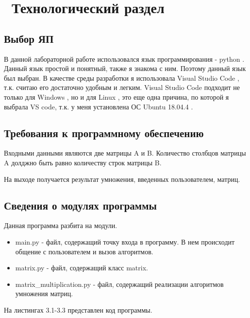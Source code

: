\chapter{ Технологический раздел}
\label{cha:design}

\section{Выбор ЯП}

В данной лабораторной работе использовался язык программирования - python \cite{bib1}.
Данный язык простой и понятный, также я знакома с ним.
Поэтому данный язык был выбран. 
В качестве среды разработки я использовала Visual Studio Code \cite{bib2}, т.к. считаю его достаточно удобным и легким.
Visual Studio Code подходит не только для  Windows \cite{bib3}, но и для Linux \cite{bib4}, это еще одна причина, по которой я выбрала VS code, т.к. у меня установлена ОС Ubuntu 18.04.4 \cite{bib5}.

\section{Требования к программному обеспечению}

Входными данными являются две матрицы A и B.
Количество столбцов матрицы A долджно быть равно количеству строк матрицы B. 

На выходе получается результат умножения, введенных пользователем, матриц.

\section{Сведения о модулях программы}

Данная программа разбита на модули.

\begin{itemize}
    \item main.py - файл, содержащий точку входа в программу. В нем происходит общение с пользователем и вызов алгоритмов.
    \item matrix.py - файл, содержащий класс matrix.
    \item matrix\_multiplication.py - файл, содержащий реализации алгоритмов умножения матриц.
\end{itemize}

На листингах 3.1-3.3 представлен код программы.


